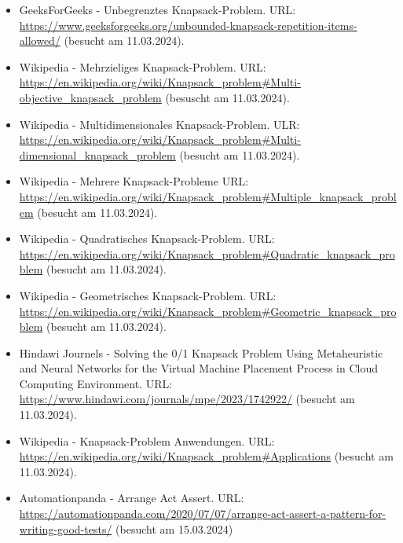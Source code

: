 \begin{itemize}
    \item GeeksForGeeks - Unbegrenztes Knapsack-Problem. URL: \url{https://www.geeksforgeeks.org/unbounded-knapsack-repetition-items-allowed/} (besucht am 11.03.2024).
    \item Wikipedia - Mehrzieliges Knapsack-Problem. URL: \url{https://en.wikipedia.org/wiki/Knapsack_problem#Multi-objective_knapsack_problem} (besuscht am 11.03.2024).
    \item Wikipedia - Multidimensionales Knapsack-Problem. ULR: \url{https://en.wikipedia.org/wiki/Knapsack_problem#Multi-dimensional_knapsack_problem} (besucht am 11.03.2024).
    \item Wikipedia - Mehrere Knapsack-Probleme URL: \url{https://en.wikipedia.org/wiki/Knapsack_problem#Multiple_knapsack_problem} (besucht am 11.03.2024).
    \item Wikipedia - Quadratisches Knapsack-Problem. URL: \url{https://en.wikipedia.org/wiki/Knapsack_problem#Quadratic_knapsack_problem} (besucht am 11.03.2024).
    \item Wikipedia - Geometrisches Knapsack-Problem. URL: \url{https://en.wikipedia.org/wiki/Knapsack_problem#Geometric_knapsack_problem} (besucht am 11.03.2024).
    \item Hindawi Journels - Solving the 0/1 Knapsack Problem Using Metaheuristic and Neural Networks for the Virtual Machine Placement Process in Cloud Computing Environment. URL: \url{https://www.hindawi.com/journals/mpe/2023/1742922/} (besucht am 11.03.2024).
    \item Wikipedia - Knapsack-Problem Anwendungen. URL: \url{https://en.wikipedia.org/wiki/Knapsack_problem#Applications} (besucht am 11.03.2024).
    \item Automationpanda - Arrange Act Assert. URL: \url{https://automationpanda.com/2020/07/07/arrange-act-assert-a-pattern-for-writing-good-tests/} (besucht am 15.03.2024)
\end{itemize}
